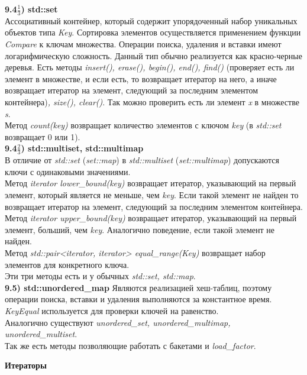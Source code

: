 \documentclass{article}
\begin{document}
\noindent \textbf{9.4$\frac{1}{3}$) std::set}\\
Ассоциативный контейнер, который содержит упорядоченный набор уникальных объектов типа \textit{Key}. Сортировка элементов осуществляется применением функции \textit{Compare} к ключам множества. Операции поиска, удаления и вставки имеют логарифмическую сложность. Данный тип обычно реализуется как красно-черные деревья.
Есть методы \textit{insert(), erase(), begin(), end(), find()} (проверяет есть ли элемент в множестве, и если есть, то возвращает итератор на него, а иначе возвращает итератор на элемент, следующий за последним элементом контейнера)\textit{, size(), clear()}.
Так можно проверить есть ли элемент \textit{x} в множестве \textit{s}.\\
Метод \textit{count(key)} возвращает количество элементов с ключом \textit{key} (в \textit{std::set} возвращает 0 или 1).\\
\noindent \textbf{9.4$\frac{2}{3}$) std::multiset, std::multimap}\\
В отличие от \textit{std::set} (\textit{set::map}) в \textit{std::multiset} (\textit{set::multimap}) допускаются ключи с одинаковыми значениями.\\
Метод \textit{iterator lower\_bound(key)} возвращает итератор, указывающий на первый элемент, который является не меньше, чем \textit{key}. Если такой элемент не найден то возвращает итератор на элемент, следующий за последним элементом контейнера.\\
Метод \textit{iterator upper\_bound(key)} возвращает итератор, указывающий на первый элемент, больший, чем \textit{key}. Аналогично поведение, если такой элемент не найден.\\
Метод \textit{std::pair<iterator, iterator> equal\_range(Key)} возвращает набор элементов для конкретного ключа.\\
Эти три методы есть и у обычных \textit{std::set, std::map}.\\
\noindent \textbf{9.5) std::unordered\_map}
Являются реализацией хеш-таблиц, поэтому операции поиска, вставки и удаления выполняются за константное время.\\
\textit{KeyEqual} используется для проверки ключей на равенство.\\
Аналогично существуют \textit{unordered\_set, unordered\_multimap, unordered\_multiset}.\\
Так же есть методы позволяющие работать с бакетами и \textit{load\_factor}.\\
\begin{center}
	\begin{large}
		\textbf{Итераторы}
	\end{large}
\end{center}
\end{document}
